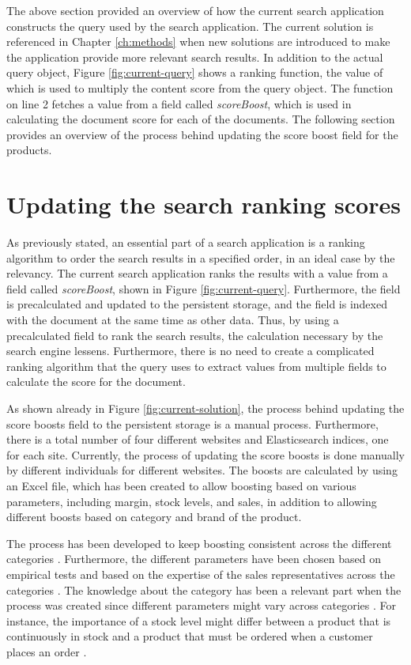 The above section provided an overview of how the current search application constructs the query used
by the search application.
The current solution is referenced in Chapter \ref{ch:methods} when 
new solutions are introduced to make the application provide more relevant search results.
In addition to the actual query object, Figure \ref{fig:current-query} shows a ranking function, 
the value of which is used to multiply the content score from the query object. 
The function on line 2 fetches a value from a field called \emph{scoreBoost}, which is used in calculating 
the document score for each of the documents.
The following section provides an overview of the process behind updating the score boost field for the
products.


\section{Updating the search ranking scores}


As previously stated, an essential part of a search application is a ranking algorithm to order the
search results in a specified order, in an ideal case by the relevancy.
The current search application ranks the results with a value from a field called \emph{scoreBoost},
shown in Figure \ref{fig:current-query}. 
Furthermore, the field is precalculated and updated to the persistent storage, and the field 
is indexed with the document at the same time as other data.
Thus, by using a precalculated field to rank the search results, the calculation necessary by the
search engine lessens.
Furthermore, there is no need to create a complicated ranking algorithm that the query uses
to extract values from multiple fields to calculate the score for the document.


As shown already in Figure \ref{fig:current-solution}, the process behind updating the 
score boosts field to the persistent storage is a manual process.
Furthermore, there is a total number of four different websites and Elasticsearch indices,
one for each site. 
Currently, the process of updating the score boosts is done manually by different individuals for different websites.
The boosts are calculated by using an Excel file, which has been created to allow boosting based on 
various parameters, including margin, stock levels, and sales, in addition to allowing
different boosts based on category and brand of the product.


The process has been developed to keep boosting consistent across the different categories 
\cite{searchSurvey}.
Furthermore, the different parameters have been chosen based on empirical tests and based on 
the expertise of the sales representatives across the categories \cite{searchSurvey}.
The knowledge about the category has been a relevant part when the process was created
since different parameters might vary across categories \cite{searchSurvey}.
For instance, the importance of a stock level might differ between a product that is 
continuously in stock and a product that must be ordered when a customer places an order
\cite{searchSurvey}.


